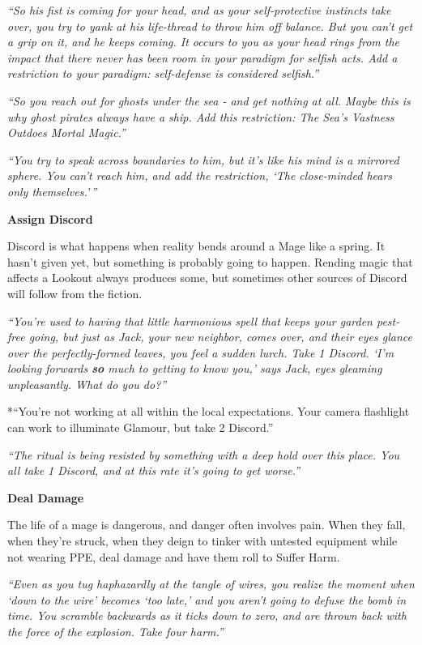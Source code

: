 \documentclass[
  oneside,
  statementpaper,
  9pt]{memoir}
\begin{document}
\emph{``So his fist is coming for your head, and as your self-protective
instincts take over, you try to yank at his life-thread to throw him off
balance. But you can't get a grip on it, and he keeps coming. It occurs
to you as your head rings from the impact that there never has been room
in your paradigm for selfish acts. Add a restriction to your paradigm:
self-defense is considered selfish.''}

\emph{``So you reach out for ghosts under the sea - and get nothing at
all. Maybe this is why ghost pirates always have a ship. Add this
restriction: The Sea's Vastness Outdoes Mortal Magic.''}

\emph{``You try to speak across boundaries to him, but it's like his
mind is a mirrored sphere. You can't reach him, and add the restriction,
`The close-minded hears only themselves.'\,''}

\textbf{Assign Discord}

Discord is what happens when reality bends around a Mage like a spring.
It hasn't given yet, but something is probably going to happen. Rending
magic that affects a Lookout always produces some, but sometimes other
sources of Discord will follow from the fiction.

\emph{``You're used to having that little harmonious spell that keeps
your garden pest-free going, but just as Jack, your new neighbor, comes
over, and their eyes glance over the perfectly-formed leaves, you feel a
sudden lurch. Take 1 Discord. `I'm looking forwards
\textbf{\emph{\emph{so}}} much to getting to know you,' says Jack, eyes
gleaming unpleasantly. What do you do?''}

*``You're not working at all within the local expectations. Your camera
flashlight can work to illuminate Glamour, but take 2 Discord.''

\emph{``The ritual is being resisted by something with a deep hold over
this place. You all take 1 Discord, and at this rate it's going to get
worse.''}

\textbf{Deal Damage}

The life of a mage is dangerous, and danger often involves pain. When
they fall, when they're struck, when they deign to tinker with untested
equipment while not wearing PPE, deal damage and have them roll to
Suffer Harm.

\emph{``Even as you tug haphazardly at the tangle of wires, you realize
the moment when `down to the wire' becomes `too late,' and you aren't
going to defuse the bomb in time. You scramble backwards as it ticks
down to zero, and are thrown back with the force of the explosion. Take
four harm.''}
\end{document}
